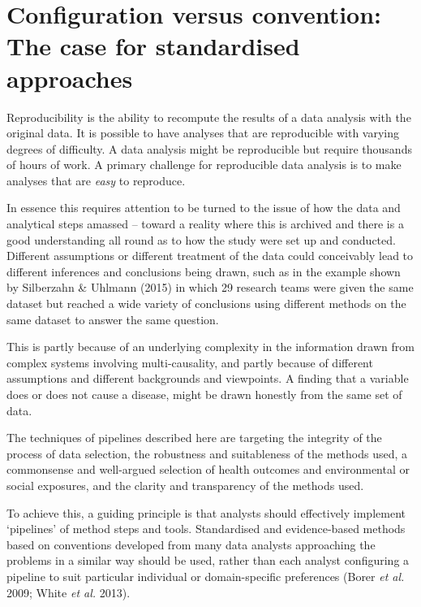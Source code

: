 \documentclass[11pt,a4paper]{article}
\begin{document}
\section{Configuration versus convention: The case for standardised
approaches}\label{configuration-versus-convention-the-case-for-standardised-approaches}

Reproducibility is the ability to recompute the results of a data
analysis with the original data. It is possible to have analyses that
are reproducible with varying degrees of difficulty. A data analysis
might be reproducible but require thousands of hours of work. A primary
challenge for reproducible data analysis is to make analyses that are
\emph{easy} to reproduce.

In essence this requires attention to be turned to the issue of how the
data and analytical steps amassed -- toward a reality where this is
archived and there is a good understanding all round as to how the study
were set up and conducted. Different assumptions or different treatment
of the data could conceivably lead to different inferences and
conclusions being drawn, such as in the example shown by Silberzahn \&
Uhlmann (2015) in which 29 research teams were given the same dataset
but reached a wide variety of conclusions using different methods on the
same dataset to answer the same question.

This is partly because of an underlying complexity in the information
drawn from complex systems involving multi-causality, and partly because
of different assumptions and different backgrounds and viewpoints. A
finding that a variable does or does not cause a disease, might be drawn
honestly from the same set of data.

The techniques of pipelines described here are targeting the integrity
of the process of data selection, the robustness and suitableness of the
methods used, a commonsense and well-argued selection of health outcomes
and environmental or social exposures, and the clarity and transparency
of the methods used.

To achieve this, a guiding principle is that analysts should effectively
implement `pipelines' of method steps and tools. Standardised and
evidence-based methods based on conventions developed from many data
analysts approaching the problems in a similar way should be used,
rather than each analyst configuring a pipeline to suit particular
individual or domain-specific preferences (Borer \emph{et al.} 2009;
White \emph{et al.} 2013).
\end{document}
